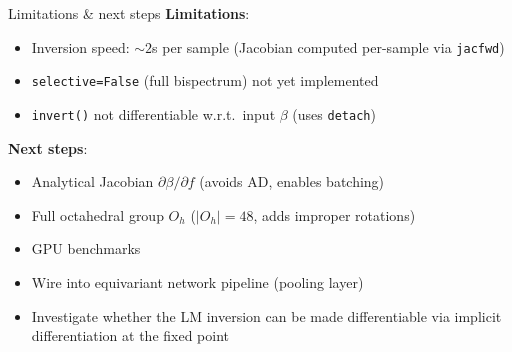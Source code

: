 \documentclass[aspectratio=169]{beamer}
\begin{document}
\begin{frame}{Limitations \& next steps}
  \textbf{Limitations}:
  \begin{itemize}
    \item Inversion speed: ${\sim}2$s per sample (Jacobian computed per-sample via \texttt{jacfwd})
    \item \texttt{selective=False} (full bispectrum) not yet implemented
    \item \texttt{invert()} not differentiable w.r.t.\ input $\beta$ (uses \texttt{detach})
  \end{itemize}

  \bigskip

  \textbf{Next steps}:
  \begin{itemize}
    \item Analytical Jacobian $\partial\beta/\partial f$ (avoids AD, enables batching)
    \item Full octahedral group $O_h$ ($|O_h| = 48$, adds improper rotations)
    \item GPU benchmarks
    \item Wire into equivariant network pipeline (pooling layer)
    \item Investigate whether the LM inversion can be made differentiable
          via implicit differentiation at the fixed point
  \end{itemize}
\end{frame}
\end{document}
